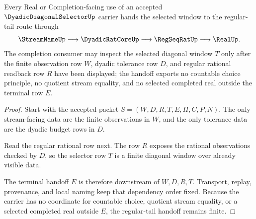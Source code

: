 \begin{theorem}
\label{thm:dyadic-diagonal-selector-regular-tail-handoff}
Every Real or Completion-facing use of an accepted $\DyadicDiagonalSelectorUp$ carrier hands the selected window to the regular-tail route through
$$
\StreamNameUp\longrightarrow \DyadicRatCoreUp\longrightarrow \RegSeqRatUp\longrightarrow \RealUp .
$$
The completion consumer may inspect the selected diagonal window $T$ only after the finite observation row $W$, dyadic tolerance row $D$, and regular rational readback row $R$ have been displayed; the handoff exports no countable choice principle, no quotient stream equality, and no selected completed real outside the terminal row $E$.
\end{theorem}
\begin{proof}
Start with the accepted packet $S=(W,D,R,T,E,H,C,P,N)$. The only stream-facing data are the finite observations in $W$, and the only tolerance data are the dyadic budget rows in $D$.

Read the regular rational row next. The row $R$ exposes the rational observations checked by $D$, so the selector row $T$ is a finite diagonal window over already visible data.

The terminal handoff $E$ is therefore downstream of $W,D,R,T$. Transport, replay, provenance, and local naming keep that dependency order fixed. Because the carrier has no coordinate for countable choice, quotient stream equality, or a selected completed real outside $E$, the regular-tail handoff remains finite.
\end{proof}




